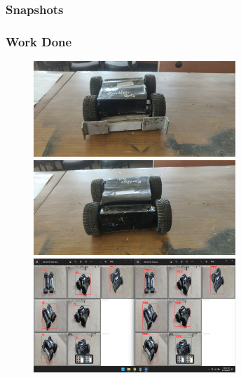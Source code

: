 \subsubsection{Snapshots}
\subsubsection{Work Done}
\begin{figure}[!th] %
	\includegraphics[width = 3in]{images/botpic10.jpg} 
	\hspace{.5cm}
	\includegraphics[width = 3in]{images/botpic11.jpg} 
	\label{figSample1} %
	\includegraphics[width = 3in]{images/botlap.png} 
	\label{figSample1} %
\end{figure}


